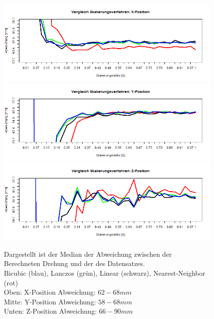 \begin{figure}
	\centering
	\includegraphics[width=\linewidth]{img_Skalierung/Skal_Diff_TX}
	\includegraphics[width=\linewidth]{img_Skalierung/Skal_Diff_TY}
	\includegraphics[width=\linewidth]{img_Skalierung/Skal_Diff_TZ}
	\caption{Dargestellt ist der Median der Abweichung zwischen der Berechneten Drehung und der des Datensatzes.\\
		Bicubic (blau), Lanczos (grün), Linear (schwarz), Nearest-Neighbor (rot)\\
		Oben: X-Position Abweichung: $62-68mm$\\
		Mitte: Y-Position Abweichung: $58-68mm$\\
		Unten: Z-Position Abweichung: $66-90mm$}
	\label{img_Pos_Dif}
\end{figure}
